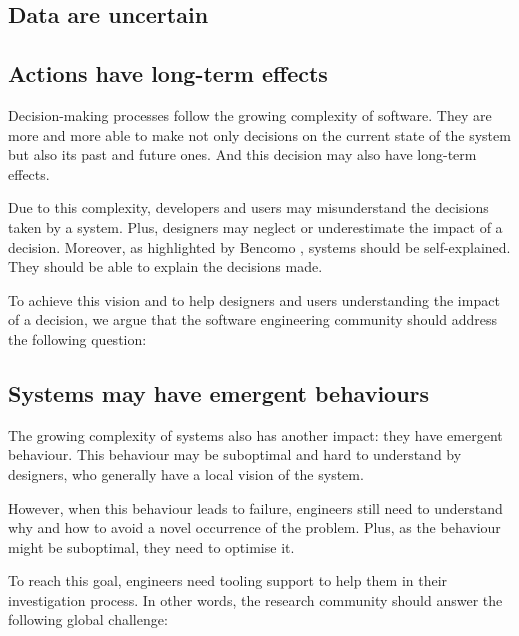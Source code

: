 \subsection{Data are uncertain}
\label{intro:challenges:u-data}


\subsection{Actions have long-term effects}
\label{intro:challenges:long-term-act}
Decision-making processes follow the growing complexity of software.
They are more and more able to make not only decisions on the current state of the system but also its past and future ones.
And this decision may also have long-term effects.

Due to this complexity, developers and users may misunderstand the decisions taken by a system.
Plus, designers may neglect or underestimate the impact of a decision.
Moreover, as highlighted by Bencomo \etal \cite{DBLP:conf/iceccs/BencomoWSW12}, systems should be self-explained.
They should be able to explain the decisions made.

To achieve this vision and to help designers and users understanding the impact of a decision, we argue that the software engineering community should address the following question:
\vspace{-2em}

\subsection{Systems may have emergent behaviours}
\label{intro:challenges:ermger-bhv}
The growing complexity of systems also has another impact: they have emergent behaviour.
This behaviour may be suboptimal and hard to understand by designers, who generally have a local vision of the system.

However, when this behaviour leads to failure, engineers still need to understand why and how to avoid a novel occurrence of the problem.
Plus, as the behaviour might be suboptimal, they need to optimise it.

To reach this goal, engineers need tooling support to help them in their investigation process.
In other words, the research community should answer the following global challenge:
\vspace{-2em}

